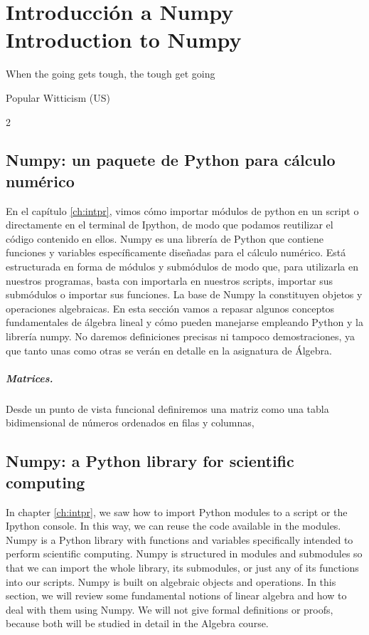 \chapter{Introducción a Numpy\\ Introduction to Numpy} \label{ch:numpy}
\epigraph{When the going gets tough, the tough get going}{Popular Witticism (US)}
\begin{paracol}{2}
\section{Numpy: un paquete de Python para cálculo nu\-mérico}
En el capítulo \ref{ch:intpr}, vimos cómo importar mó\-dulos de python en un script o directamente en el terminal de Ipython, de modo que podamos reutilizar el código contenido en ellos. Numpy es una librería de Python que contiene funciones y variables específicamente diseñadas para el cálculo numérico. Está estructurada en forma de módulos y submódulos de modo que, para utilizarla en nuestros programas, basta con importarla en nuestros scripts, importar sus submódulos o importar sus funciones.
La base de Numpy la constituyen objetos y operaciones algebraicas. En esta sección vamos a repasar algunos conceptos fundamentales de  álgebra lineal y cómo pueden manejarse empleando Python y la librería numpy. No daremos definiciones precisas ni tampoco demostraciones, ya que tanto unas como otras se verán en detalle en la asignatura de Álgebra.

\paragraph{Matrices.} Desde un punto de vista funcional definiremos una matriz como una tabla bidimensional de números ordenados en filas y columnas,
\switchcolumn

\section{Numpy: a Python library for scientific computing}

In chapter \ref{ch:intpr}, we saw how to import Python modules to a script or the Ipython console. In this way, we can reuse the code available in the modules. Numpy is a Python library with functions and variables specifically intended to perform scientific computing. Numpy is structured in modules and submodules so that we can import the whole library, its submodules, or just any of its functions into our scripts. Numpy is built on algebraic objects and operations. In this section, we will review some fundamental notions of linear algebra and how to deal with them using Numpy. We will not give formal definitions or proofs, because both will be studied in detail in the Algebra course.

\end{paracol}
